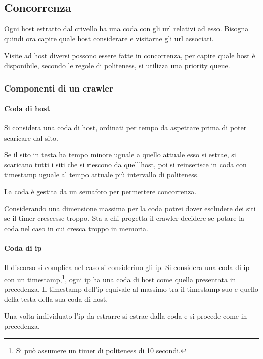 \subsection{Concorrenza}
Ogni host estratto dal crivello ha una coda con gli url relativi ad esso. 
Bisogna quindi ora capire quale host considerare e visitarne gli url associati.

Visite ad host diversi possono essere fatte in concorrenza, per capire 
quale host è disponibile, secondo le regole di politeness, si utilizza una priority queue.

\subsubsection{Componenti di un crawler}

\paragraph{Coda di host}
Si considera una coda di host, ordinati per tempo da aspettare 
prima di poter scaricare dal sito. 

Se il sito in testa ha tempo minore uguale a quello attuale esso si estrae, 
si scaricano tutti i siti che si riescono da quell'host, poi si reinserisce 
in coda con timestamp uguale al tempo attuale più intervallo di politeness.

La coda è gestita da un semaforo per permettere concorrenza.

\begin{remark}
    Considerando una dimensione massima per la coda potrei dover
    escludere dei siti se il timer crescesse troppo. Sta a chi progetta 
    il crawler decidere se potare la coda nel caso in cui cresca troppo in 
    memoria.
\end{remark}

\paragraph{Coda di ip}
Il discorso si complica nel caso si considerino gli ip. 
Si considera una coda di ip con un timestamp,\footnote{Si può assumere
un timer di politeness di 10 secondi.}, ogni ip ha una coda di host 
come quella presentata in precedenza.
Il timestamp dell'ip equivale al massimo tra il timestamp suo e quello 
della testa della sua coda di host.

Una volta individuato l'ip da estrarre si estrae dalla coda e si procede 
come in precedenza.

